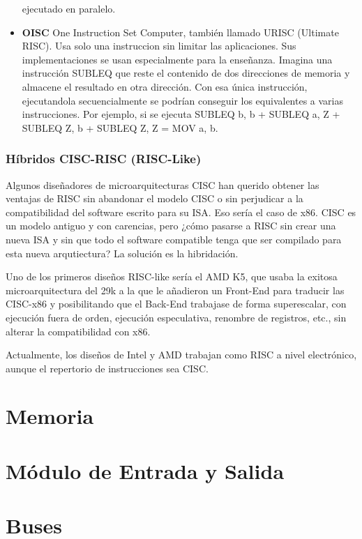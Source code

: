 \documentclass[a4paper, 11pt, titlepage]{article}
\begin{document}
\begin{itemize}
                ejecutado en paralelo.
                \item \textbf{OISC} One Instruction Set Computer, también llamado URISC (Ultimate RISC). Usa solo una instruccion 
                sin limitar las aplicaciones. Sus implementaciones se usan especialmente para la enseñanza. Imagina una instrucción 
                SUBLEQ que reste el contenido de dos direcciones de memoria y almacene el resultado en otra dirección. Con esa única 
                instrucción, ejecutandola secuencialmente se podrían conseguir los equivalentes a varias instrucciones. Por ejemplo, 
                si se ejecuta SUBLEQ b, b + SUBLEQ a, Z + SUBLEQ Z, b + SUBLEQ Z, Z = MOV a, b.            
            \end{itemize}

        \subsubsection{Híbridos CISC-RISC (RISC-Like)}

            Algunos diseñadores de microarquitecturas CISC han querido obtener las ventajas de RISC sin abandonar el modelo CISC o sin 
            perjudicar a la compatibilidad del software escrito para su ISA. Eso sería el caso de x86. CISC es un modelo antiguo y con 
            carencias, pero ¿cómo pasarse a RISC sin crear una nueva ISA y sin que todo el software compatible tenga que ser compilado 
            para esta nueva arqutiectura? La solución es la hibridación.

            Uno de los primeros diseños RISC-like sería el AMD K5, que usaba la exitosa microarquitectura del 29k a la que le añadieron 
            un Front-End para traducir las CISC-x86 y posibilitando que el Back-End trabajase de forma superescalar, con ejecución fuera 
            de orden, ejecución especulativa, renombre de registros, etc., sin alterar la compatibilidad con x86.

            Actualmente, los diseños de Intel y AMD trabajan como RISC a nivel electrónico, aunque el repertorio de instrucciones sea 
            CISC.

\section{Memoria}\label{memoria}
\section{Módulo de Entrada y Salida}\label{entradasalida}
\section{Buses}
\end{document}
